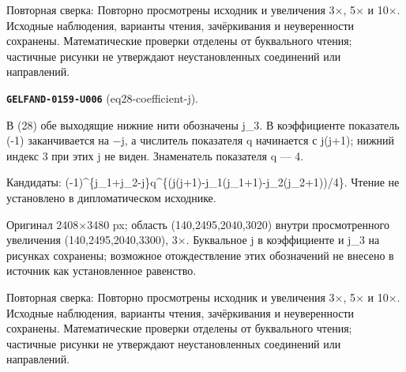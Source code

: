 Повторная сверка: Повторно просмотрены исходник и увеличения 3×, 5× и 10×. Исходные наблюдения, варианты чтения, зачёркивания и неуверенности сохранены. Математические проверки отделены от буквального чтения; частичные рисунки не утверждают неустановленных соединений или направлений.\par\medskip
\par\noindent\leavevmode{}\label{GELFAND-0159-U006}\label{GELFAND-P001466:eq28-coefficient-j}\textbf{\texttt{GELFAND-0159-U006}} (eq28-coefficient-j).\nopagebreak[4]\par
В (28) обе выходящие нижние нити обозначены j\_3. В коэффициенте показатель (-1) заканчивается на −j, а числитель показателя q начинается с j(j+1); нижний индекс 3 при этих j не виден. Знаменатель показателя q — 4.\par
Кандидаты: (-1)\textasciicircum{}\{j\_1+j\_2-j\}q\textasciicircum{}\{(j(j+1)-j\_1(j\_1+1)-j\_2(j\_2+1))/4\}. Чтение не установлено в дипломатическом исходнике.\par
Оригинал 2408×3480 px; область (140,2495,2040,3020) внутри просмотренного увеличения (140,2495,2040,3300), 3×. Буквальное j в коэффициенте и j\_3 на рисунках сохранены; возможное отождествление этих обозначений не внесено в источник как установленное равенство.\par
Повторная сверка: Повторно просмотрены исходник и увеличения 3×, 5× и 10×. Исходные наблюдения, варианты чтения, зачёркивания и неуверенности сохранены. Математические проверки отделены от буквального чтения; частичные рисунки не утверждают неустановленных соединений или направлений.\par\medskip
